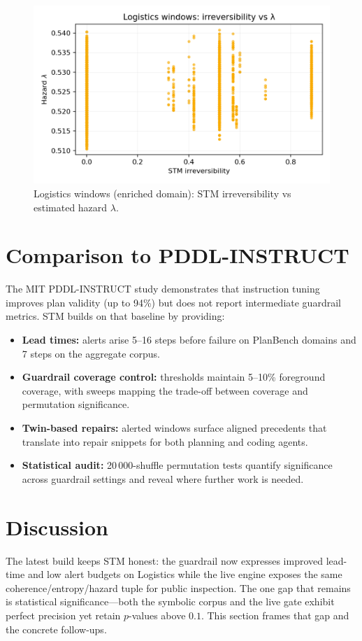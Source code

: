 \documentclass[11pt]{article}
\begin{document}
\begin{figure}[h]
  \centering
  \includegraphics[width=0.72\linewidth]{../figures/fig3_logistics_irreversibility_vs_lambda.png}
  \caption{Logistics windows (enriched domain): STM irreversibility vs estimated hazard $\lambda$.}
  \label{fig:logistics-irrev-lambda}
\end{figure}
\section{Comparison to PDDL-INSTRUCT}
The MIT PDDL-INSTRUCT study \cite{verma2025pddlinstruct} demonstrates that
instruction tuning improves plan validity (up to 94\%) but does not report
intermediate guardrail metrics. STM builds on that baseline by providing:
\begin{itemize}
  \item \textbf{Lead times:} alerts arise 5--16 steps before failure on PlanBench
  domains and 7 steps on the aggregate corpus.
  \item \textbf{Guardrail coverage control:} thresholds maintain 5--10\% foreground
  coverage, with sweeps mapping the trade-off between coverage and permutation
  significance.
  \item \textbf{Twin-based repairs:} alerted windows surface aligned precedents
  that translate into repair snippets for both planning and coding agents.
  \item \textbf{Statistical audit:} 20\,000-shuffle permutation tests quantify
  significance across guardrail settings and reveal where further work is needed.
\end{itemize}

\section{Discussion}
The latest build keeps STM honest: the guardrail now expresses improved lead-time
and low alert budgets on Logistics while the live engine exposes the same 
coherence/entropy/hazard tuple for public inspection. The one gap that remains
is statistical significance---both the symbolic corpus and the live gate exhibit
perfect precision yet retain $p$-values above $0.1$. This section frames that gap
and the concrete follow-ups.
\end{document}
